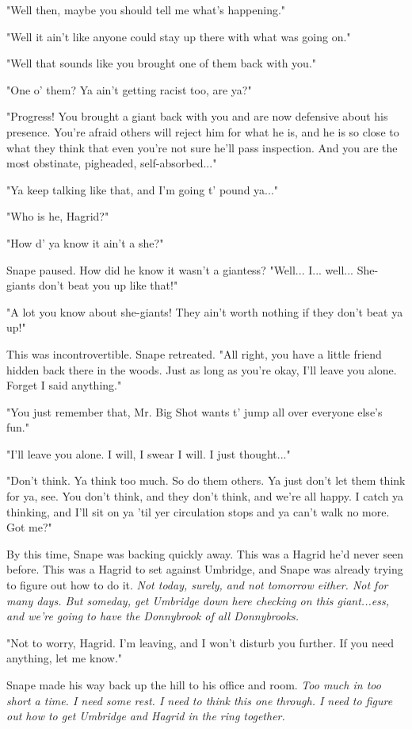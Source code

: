 \documentclass[a4paper,11pt]{article}
\begin{document}
"Well then, maybe you should tell me what's happening."

"Well it ain't like anyone could stay up there with what was going on."

"Well that sounds like you brought one of them back with you."

"One o' them? Ya ain't getting racist too, are ya?"

"Progress! You brought a giant back with you and are now defensive about his presence. You're afraid others will reject him for what he is, and he is so close to what they think that even you're not sure he'll pass inspection. And you are the most obstinate, pigheaded, self-absorbed..."

"Ya keep talking like that, and I'm going t' pound ya..."

"Who is he, Hagrid?"

"How d' ya know it ain't a she?"

Snape paused. How did he know it wasn't a giantess? "Well... I... well... She-giants don't beat you up like that!"

"A lot you know about she-giants! They ain't worth nothing if they don't beat ya up!"

This was incontrovertible. Snape retreated. "All right, you have a little friend hidden back there in the woods. Just as long as you're okay, I'll leave you alone. Forget I said anything."

"You just remember that, Mr. Big Shot wants t' jump all over everyone else's fun."

"I'll leave you alone. I will, I swear I will. I just thought..."

"Don't think. Ya think too much. So do them others. Ya just don't let them think for ya, see. You don't think, and they don't think, and we're all happy. I catch ya thinking, and I'll sit on ya 'til yer circulation stops and ya can't walk no more. Got me?"

By this time, Snape was backing quickly away. This was a Hagrid he'd never seen before. This was a Hagrid to set against Umbridge, and Snape was already trying to figure out how to do it. \emph{Not today, surely, and not tomorrow either. Not for many days. But someday, get Umbridge down here checking on this giant...ess, and we're going to have the Donnybrook of all Donnybrooks.}

"Not to worry, Hagrid. I'm leaving, and I won't disturb you further. If you need anything, let me know."

Snape made his way back up the hill to his office and room. \emph{Too much in too short a time. I need some rest. I need to think this one through. I need to figure out how to get Umbridge and Hagrid in the ring together.}
\end{document}
